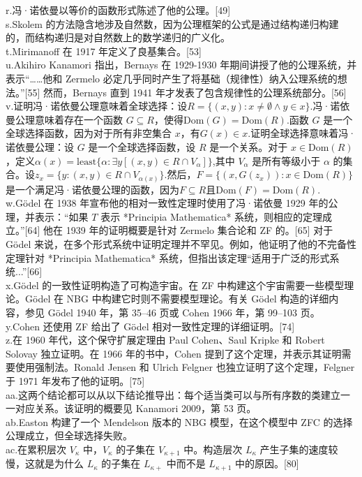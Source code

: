 r.冯·诺依曼以等价的函数形式陈述了他的公理。[49]\\
s.Skolem 的方法隐含地涉及自然数，因为公理框架的公式是通过结构递归构建的，而结构递归是对自然数上的数学递归的广义化。\\
t.Mirimanoff 在 1917 年定义了良基集合。[53]\\
u.Akihiro Kanamori 指出，Bernays 在 1929-1930 年期间讲授了他的公理系统，并表示“……他和 Zermelo 必定几乎同时产生了将基础（规律性）纳入公理系统的想法。”[55] 然而，Bernays 直到 1941 年才发表了包含规律性的公理系统部分。[56]\\
v.证明冯·诺依曼公理意味着全球选择：设\(R = \{(x, y): x \neq \emptyset \land y \in x\}\).冯·诺依曼公理意味着存在一个函数 \(G \subseteq R\)，使得\(\text{Dom}(G) = \text{Dom}(R)\).函数 \(G\) 是一个全球选择函数，因为对于所有非空集合 \(x\)，有\(G(x) \in x\).证明全球选择意味着冯·诺依曼公理：设 \(G\) 是一个全球选择函数，设 \(R\) 是一个关系。对于 \(x \in \text{Dom}(R)\)，定义\(\alpha(x) = \text{least} \{\alpha : \exists y [(x, y) \in R \cap V_\alpha]\}\),其中 \(V_\alpha\) 是所有等级小于 \(\alpha\) 的集合。设\(z_x = \{ y : (x, y) \in R \cap V_{\alpha(x)} \}\).然后，\(F = \{ (x, G(z_x)) : x \in \text{Dom}(R) \}\)是一个满足冯·诺依曼公理的函数，因为\(F \subseteq R\)且\(\text{Dom}(F) = \text{Dom}(R)\).\\
w.Gödel 在 1938 年宣布他的相对一致性定理时使用了冯·诺依曼 1929 年的公理，并表示：“如果 \(T\) 表示 *Principia Mathematica* 系统，则相应的定理成立。”[64] 他在 1939 年的证明概要是针对 Zermelo 集合论和 ZF 的。[65] 对于 Gödel 来说，在多个形式系统中证明定理并不罕见。例如，他证明了他的不完备性定理针对 *Principia Mathematica* 系统，但指出该定理“适用于广泛的形式系统...”[66]\\
x.Gödel 的一致性证明构造了可构造宇宙。在 ZF 中构建这个宇宙需要一些模型理论。Gödel 在 NBG 中构建它时则不需要模型理论。有关 Gödel 构造的详细内容，参见 Gödel 1940 年，第 35–46 页或 Cohen 1966 年，第 99–103 页。\\
y.Cohen 还使用 ZF 给出了 Gödel 相对一致性定理的详细证明。[74]\\
z.在 1960 年代，这个保守扩展定理由 Paul Cohen、Saul Kripke 和 Robert Solovay 独立证明。在 1966 年的书中，Cohen 提到了这个定理，并表示其证明需要使用强制法。Ronald Jensen 和 Ulrich Felgner 也独立证明了这个定理，Felgner 于 1971 年发布了他的证明。[75]\\
aa.这两个结论都可以从以下结论推导出：每个适当类可以与所有序数的类建立一一对应关系。该证明的概要见 Kanamori 2009，第 53 页。\\
ab.Easton 构建了一个 Mendelson 版本的 NBG 模型，在这个模型中 ZFC 的选择公理成立，但全球选择失败。\\
ac.在累积层次 \(V_\kappa\) 中，\(V_\kappa\) 的子集在 \(V_{\kappa+1}\) 中。构造层次 \(L_\kappa\) 产生子集的速度较慢，这就是为什么 \(L_\kappa\) 的子集在 \(L_{\kappa+}\) 中而不是 \(L_{\kappa+1}\) 中的原因。[80]
